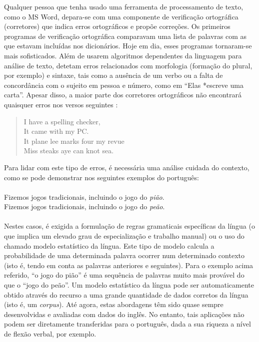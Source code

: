 \begin{multicols}{2}
Qualquer pessoa que tenha usado uma ferramenta de processamento de texto, como o MS Word, depara-se com uma componente de verificação ortográfica (corretores) que indica erros ortográficos e propõe correções. Os primeiros programas de verificação ortográfica comparavam uma lista de palavras com as que estavam incluídas nos dicionários. Hoje em dia, esses programas tornaram-se mais sofisticados. Além de usarem algoritmos dependentes da linguagem para análise de texto, detetam erros relacionados com morfologia (formação do plural, por exemplo) e sintaxe, tais como a ausência de um verbo ou a falta de concordância com o sujeito em pessoa e número, como em “Elas *escreve uma carta”. Apesar disso, a maior parte dos corretores ortográficos não encontrará quaisquer erros nos versos seguintes \cite{zar1}:

\begin{quote}
  I have a spelling checker,\\
  It came with my PC.\\
  It plane lee marks four my revue\\
  Miss steaks aye can knot sea.
\end{quote}

Para lidar com este tipo de erros, é necessária uma análise cuidada do contexto, como se pode demonstrar nos seguintes exemplos do português:\\
\\
Fizemos jogos tradicionais, incluindo o jogo do \textit{pião}.\\
Fizemos jogos tradicionais, incluindo o jogo do \textit{peão}.\\
\\
Nestes casos, é exigida a formulação de regras gramaticais específicas da língua (o que implica um elevado grau de especialização e trabalho manual) ou o uso do chamado modelo estatístico da língua. Este tipo de modelo calcula a probabilidade de uma determinada palavra ocorrer num determinado contexto (isto é, tendo em conta as palavras anteriores e seguintes). Para o exemplo acima referido, “o jogo do pião” é uma sequência de palavras muito mais provável do que o “jogo do peão”. Um mo\-de\-lo estatístico da língua pode ser automaticamente obtido através do recurso a uma grande quantidade de dados corretos da língua (isto é, um \textit{corpus}). Até agora, estas abordagens têm sido quase sempre desenvolvidas e avaliadas com dados do inglês. No entanto, tais aplicações não podem ser diretamente transferidas para o português, dada a sua riqueza a nível de flexão verbal, por exemplo.


\end{multicols}
